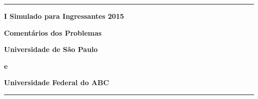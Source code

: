 \documentclass[a4paper,11pt]{article}
\newcommand{\PASTA}{.}
\newcommand{\incluir}[2]{
\renewcommand{\PASTA}{#1}

}
\begin{document}
\begin{center}
\noindent

\hrule

\vspace{3.0cm}

\begin{Huge}
  {\bf I Simulado para Ingressantes 2015}
\end{Huge}

\vspace{8.0cm}

\begin{Huge}
{\bf Comentários dos Problemas}
\end{Huge}

\vspace{8.0cm}

\begin{Large}
  {\bf Universidade de São Paulo}
\end{Large}

\vspace{0.5cm}

\begin{Large}
  \textbf{e}
\end{Large}

\vspace{0.5cm}

\begin{Large}
  \textbf{Universidade Federal do ABC}
\end{Large}

\vfill
\hrule
\end{center}


\thispagestyle{empty}

\newpage

\setcounter{letra}{1}
\newcommand{\proxLetra}{\Alph{letra}\stepcounter{letra}}

\incluir{bacterias/docs}{comentario.tex}
\vspace*{0.5cm}
\incluir{cavaleiros/docs}{comentario.tex}
\vspace*{0.5cm}
\incluir{imparmiopia/docs}{comentario.tex}
\vspace*{0.5cm}
\incluir{freeshop/docs}{comentario.tex}
\vspace*{0.5cm}
\incluir{competicao/docs}{comentario.tex}
\vspace*{0.5cm}
\incluir{integramix/docs}{comentario.tex}
\vspace*{0.5cm}
\incluir{velha/docs}{comentario.tex}
\vspace*{0.5cm}
\incluir{ideais/docs}{comentario.tex}
\vspace*{0.5cm}
\incluir{lista/docs}{comentario.tex}
\vspace*{0.5cm}
\incluir{miojo/docs}{comentario.tex}
\vspace*{0.5cm}
\incluir{cafe/docs}{comentario.tex}
\vspace*{0.5cm}
\end{document}
